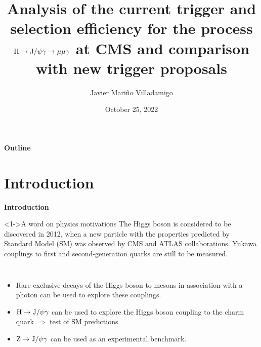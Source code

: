 \documentclass[aspectratio = 1610, xcolor = dvipsnames]{beamer}
\title[]{{\large  Analysis of the current trigger and selection efficiency for the process $\H \rightarrow \JPsi\gamma \rightarrow \mu\mu\gamma$ at CMS and comparison with new trigger proposals}} %
\author{Javier Mariño Villadamigo} %
\institute[unipd] %
{
	\scriptsize{Research Activities} \\ 
	\scriptsize{Academic year: 2021/2022} \\
	\smallskip
	\scriptsize{Università degli studi di Padova} %
}
\date{October 25, 2022} %
\newcommand{\JPsi}{{\rm J}/\psi}
\begin{document}
	
	\begin{frame}
		\titlepage %
	\end{frame}

	
	
	
	
	\begin{frame}[t]{\bf Outline}
	\tableofcontents
	\end{frame}
	
	
	\section{Introduction}
        \begin{frame}[t]{\bf Introduction}
            \begin{block}<1->{A word on physics motivations}
                The Higgs boson is considered to be discovered in 2012, when a new particle with the properties predicted by Standard Model (SM) was observed by CMS and ATLAS collaborations. Yukawa couplings to first and second-generation quarks are still to be measured.
            \end{block}
            
            \begin{columns}[c]
                    \begin{itemize}
                        \item \textcolor{unipd}{Rare exclusive decays} of the Higgs boson to mesons in association with a photon can be used to explore these couplings.
                        \item ${\rm H}\rightarrow \JPsi \gamma$ can be used to explore the Higgs boson \textcolor{unipd}{coupling to the charm quark} $\Rightarrow$ \textcolor{unipd}{test of SM predictions}.
                        \item ${\rm Z}\rightarrow \JPsi \gamma$ can be used as an \textcolor{unipd}{experimental benchmark}.
                    \end{itemize}
            \end{columns}
        \end{frame}
	
\end{document}
